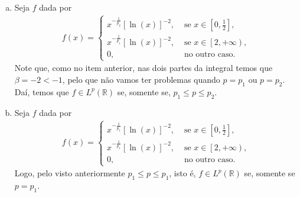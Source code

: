 \begin{homeworkProblem}[Seção 1]
\begin{solution}
\begin{enumerate}[a)]
      Por outro lado, se $p=p_1$, note que $-\frac{p}{p_1}=-1$, pelo que temos que a segunda integral diverge, poiss $\alpha=-1$ e $\beta=-1$. Analogamente, se $p=p_2$, nos temos que a primeira integral diverge, poiss $\alpha=-\frac{p}{p_2}=-1$ e $\beta=-\frac{p}{p_2}=-1$.\\
      Daí, se $p_1<p<p_2$, nos temos que $-\frac{p}{p_2}>-1$ e $-\frac{p}{p_1}<-1$, pelo que podemos garantir que $f\in L^{p}(\mathbb{R})$.\\
      Assim, temos que $f\in L^{p}(\mathbb{R})$ se, somente se, $p_1<p<p_2$.
    \item Seja $f$ dada por
      \begin{align*}
        f(x)=\begin{cases}
          x^{-\frac{1}{p_2}}\left[ \ln(x) \right]^{-2}, &\text{ se } x\in\left[ 0,\frac{1}{2} \right] \text{,} \\
          x^{-\frac{1}{p_1}}\left[ \ln(x) \right]^{-2}, &\text{ se } x\in\left[ 2,+\infty \right),\\
          0,&\text{ no outro caso}.
        \end{cases}
      \end{align*}
      Note que, como no item anterior, nas dois partes da integral temos que $\beta=-2<-1$, pelo que não vamos ter problemas quando $p=p_1$ ou $p=p_2$. Daí, temos que $f\in L^{p}(\mathbb{R})$ se, somente se, $p_1\leq p\leq p_2$.
    \item Seja $f$ dada por
      \begin{align*}
        f(x)=\begin{cases}
          x^{-\frac{1}{p_1}}\left[ \ln(x) \right]^{-2}, &\text{ se } x\in\left[ 0,\frac{1}{2} \right] \text{,} \\
          x^{-\frac{1}{p_1}}\left[ \ln(x) \right]^{-2}, &\text{ se } x\in\left[ 2,+\infty \right),\\
          0,&\text{ no outro caso}.
        \end{cases}
      \end{align*}
      Logo, pelo visto anteriormente $p_1\leq p\leq p_1$, isto é, $f\in L^{p}(\mathbb{R})$ se, somente se $p=p_1$. 
  \end{enumerate}
  \end{solution}
\end{homeworkProblem}

